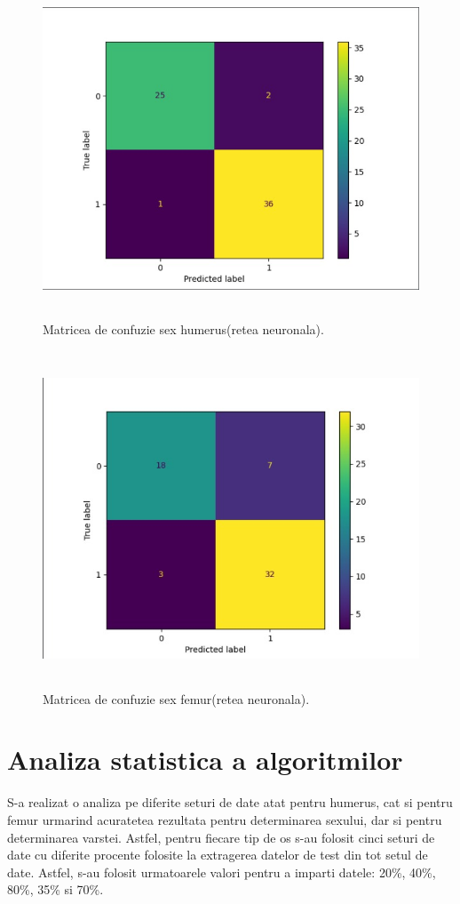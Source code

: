\documentclass[runningheads,a4paper,11pt]{report}
\begin{document}
\begin{figure}
    \centering
    \includegraphics[height=10cm]{Imagini/matrice_confuzie_sex_retea.png}
    \caption{Matricea de confuzie sex humerus(retea neuronala).}
    \label{matrice_confuzie_sex_humerus_retea}
\end{figure}

\begin{figure}
    \centering
    \includegraphics[height=10cm]{Imagini/matrice_confuzie_sex_femur_retea.png}
    \caption{Matricea de confuzie sex femur(retea neuronala).}
    \label{matrice_confuzie_femur_sex_retea}
\end{figure}

\chapter{Analiza statistica a algoritmilor}
\label{anaizaStatistica}
S-a realizat o analiza pe diferite seturi de date atat pentru humerus, cat si pentru femur urmarind acuratetea rezultata pentru determinarea sexului, dar si pentru determinarea varstei. Astfel, pentru fiecare tip de os s-au folosit cinci seturi de date cu diferite procente folosite la extragerea datelor de test din tot setul de date. Astfel, s-au folosit urmatoarele valori pentru a imparti datele: 20\%, 40\%, 80\%, 35\% si 70\%.
\end{document}
